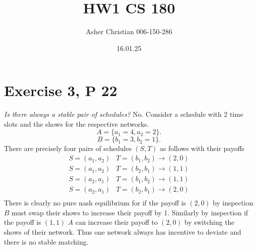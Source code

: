 \documentclass{amsart}
\title{HW1 CS 180}
\author{Asher Christian 006-150-286}
\date{ 16.01.25}
\begin{document}
\maketitle
\section{Exercise 3, P 22}
\emph{Is there always a stable pair of schedules?}
No. Consider a schedule with 2 time slots and the shows for the respective networks.
\[
    A = \{a_1 = 4, a_2 = 2\}
.\] 
\[
    B  = \{b_1 = 3, b_2 = 1\}
.\] 
There are precisely four pairs of schedules $(S,T)$ as follows with their payoffs
\begin{align*}
    S = (a_1,a_2) & T = (b_1,b_2) \rightarrow (2,0)\\
    S = (a_1,a_2) & T = (b_2,b_1) \rightarrow (1,1)\\
    S = (a_2,a_1) & T = (b_1,b_2) \rightarrow (1,1)\\
    S = (a_2,a_1) & T = (b_2,b_1) \rightarrow (2,0)\\
\end{align*}
There is clearly no pure nash equilibrium for if the payoff is $(2,0)$ by inspection  $B$ must
swap their shows to increase their payoff by 1. Similarly by inspection if the payoff is $(1,1)$ $A$ can increase
their payoff to $(2,0)$ by switching the shows of their network. Thus one network always has incentive
to deviate and there is no stable matching.
\end{document}
